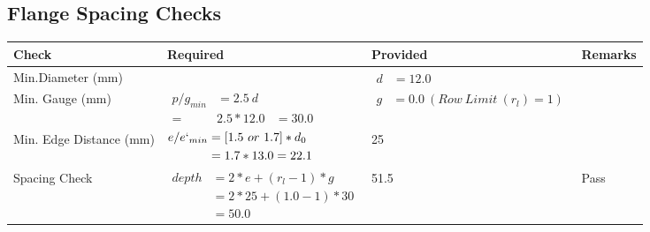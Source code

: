 \documentclass{article}%
\begin{document}
\subsection{Flange Spacing Checks}%
\label{subsec:FlangeSpacingChecks}%
\renewcommand{\arraystretch}{1.2}%
\begin{longtable}{|p{2.5cm}|p{7.5cm}|p{5cm}|p{1cm}|}%
\hline%
\rowcolor{OsdagGreen}%
Check&Required&Provided&Remarks\\%
\hline%
\endhead%
\hline%
Min.Diameter (mm)&&$\begin{aligned} d &=12.0\end{aligned}$&\\%
\hline%
Min. Gauge (mm)&$\begin{aligned}p/g_{min}&= 2.5 ~ d&\\ =&2.5*12.0&=30.0\end{aligned}$&$\begin{aligned} g &=0.0~(Row~Limit~(r_l) = 1)\end{aligned}$&\\%
\hline%
Min. Edge Distance (mm)&$\begin{aligned}e/e`_{min} &=[1.5~or~ 1.7] * d_0\\ &=1.7*13.0=22.1 \end{aligned}$&25&\\%
\hline%
Spacing Check&$\begin{aligned} depth & = 2 * e + (r_l -1) * g\\ & = 2 * 25+(1.0-1)*30\\ & = 50.0\end{aligned}$&51.5&Pass\\%
\hline%
\end{longtable}

%
\newpage%
\end{document}
